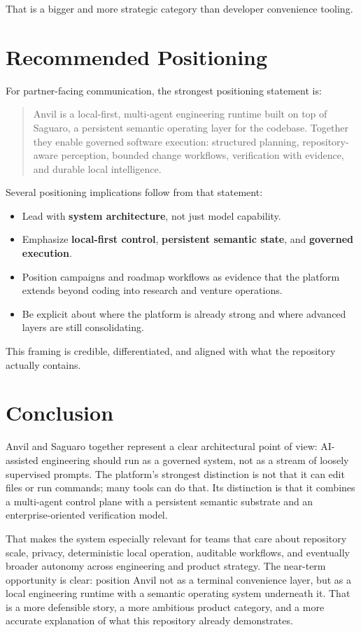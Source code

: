 \documentclass[11pt,a4paper]{article}
\begin{document}
That is a bigger and more strategic category than developer convenience tooling.

\section{Recommended Positioning}
For partner-facing communication, the strongest positioning statement is:
\begin{quote}
Anvil is a local-first, multi-agent engineering runtime built on top of Saguaro, a persistent semantic operating layer for the codebase. Together they enable governed software execution: structured planning, repository-aware perception, bounded change workflows, verification with evidence, and durable local intelligence.
\end{quote}

Several positioning implications follow from that statement:
\begin{itemize}
    \item Lead with \textbf{system architecture}, not just model capability.
    \item Emphasize \textbf{local-first control}, \textbf{persistent semantic state}, and \textbf{governed execution}.
    \item Position campaigns and roadmap workflows as evidence that the platform extends beyond coding into research and venture operations.
    \item Be explicit about where the platform is already strong and where advanced layers are still consolidating.
\end{itemize}

This framing is credible, differentiated, and aligned with what the repository actually contains.

\section{Conclusion}
Anvil and Saguaro together represent a clear architectural point of view: AI-assisted engineering should run as a governed system, not as a stream of loosely supervised prompts. The platform's strongest distinction is not that it can edit files or run commands; many tools can do that. Its distinction is that it combines a multi-agent control plane with a persistent semantic substrate and an enterprise-oriented verification model.

That makes the system especially relevant for teams that care about repository scale, privacy, deterministic local operation, auditable workflows, and eventually broader autonomy across engineering and product strategy. The near-term opportunity is clear: position Anvil not as a terminal convenience layer, but as a local engineering runtime with a semantic operating system underneath it. That is a more defensible story, a more ambitious product category, and a more accurate explanation of what this repository already demonstrates.
\end{document}
